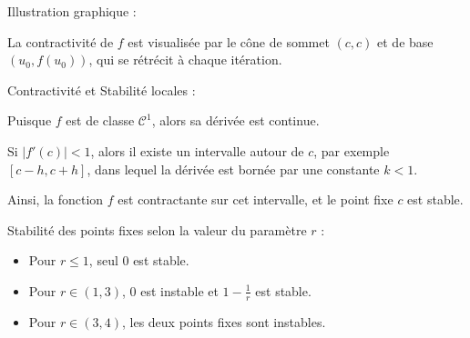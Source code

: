 \documentclass[10pt,a4paper]{article}
\begin{document}

\q Illustration graphique :

La contractivité de \( f \) est visualisée par le cône de sommet \( (c, c) \) et de base \( (u_0,
f(u_0)) \), qui se rétrécit à chaque itération.


\q Contractivité et Stabilité locales :

Puisque \( f \) est de classe \( \mathcal{C}^1 \), alors sa dérivée est continue.

Si \( |f'(c)| < 1 \), alors il existe un intervalle autour de \( c \), par exemple \( [c - h, c +
h] \), dans lequel la dérivée est bornée par une constante \( k < 1 \).

Ainsi, la fonction \( f \) est contractante sur cet intervalle, et le point fixe \( c \) est stable.


\q Stabilité des points fixes selon la valeur du paramètre \( r \) :

\begin{itemize}
    \item Pour \( r \leq 1 \), seul \( 0 \) est stable.
    \item Pour \( r \in (1,3) \), \( 0 \) est instable et \( 1 - \frac{1}{r} \) est stable.
    \item Pour \( r \in (3,4) \), les deux points fixes sont instables.
\end{itemize}
\end{document}
